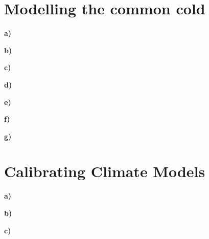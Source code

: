 \documentclass[11pt, a4paper, english]{NTNUoving}
\begin{document}
\section*{Modelling the common cold}
\textbf{a)}

\textbf{b)}

\textbf{c)}

\textbf{d)}

\textbf{e)}

\textbf{f)}

\textbf{g)}


\section*{Calibrating Climate Models}
\textbf{a)}

\textbf{b)}

\textbf{c)}

\end{document}
